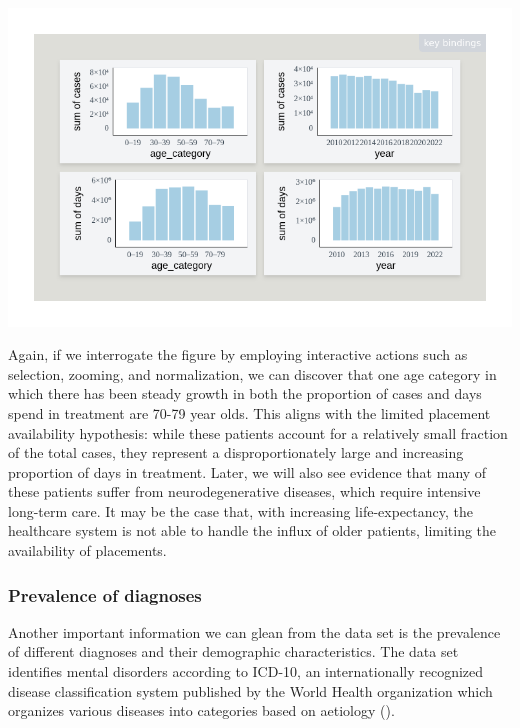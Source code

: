 \documentclass[
]{book}
\theoremstyle{definition}
\theoremstyle{definition}
\theoremstyle{definition}
\theoremstyle{definition}
\theoremstyle{remark}
\begin{document}
\begin{center}\includegraphics[width=1\linewidth,height=1\textheight]{./figures/example-cases-days-age} \end{center}

Again, if we interrogate the figure by employing interactive actions such as selection, zooming, and normalization, we can discover that one age category in which there has been steady growth in both the proportion of cases and days spend in treatment are 70-79 year olds. This aligns with the limited placement availability hypothesis: while these patients account for a relatively small fraction of the total cases, they represent a disproportionately large and increasing proportion of days in treatment. Later, we will also see evidence that many of these patients suffer from neurodegenerative diseases, which require intensive long-term care. It may be the case that, with increasing life-expectancy, the healthcare system is not able to handle the influx of older patients, limiting the availability of placements.

\subsubsection{Prevalence of diagnoses}\label{prevalence-of-diagnoses}

Another important information we can glean from the data set is the prevalence of different diagnoses and their demographic characteristics. The data set identifies mental disorders according to ICD-10, an internationally recognized disease classification system published by the World Health organization which organizes various diseases into categories based on aetiology ().
\end{document}
